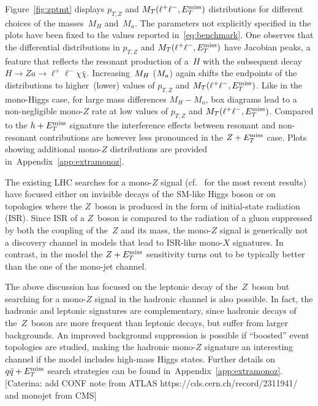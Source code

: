 Figure~\ref{fig:zptmt} displays  $p_{T,Z}$ and $M_T(\ell^+ \ell^-, E_T^\mathrm{miss})$ distributions for different choices of the masses~$M_H$ and~$M_a$. The parameters not explicitly specified in the plots have been fixed to the values reported in~\eqref{eq:benchmark}. One observes that the differential distributions in $p_{T,Z}$ and $M_T(\ell^+ \ell^-, E_T^\mathrm{miss})$ have Jacobian peaks, a feature that  reflects the resonant production of a~$H$ with the subsequent decay $H \to Z a \to \ell^+ \ell^- \chi \bar \chi$.  Increasing~$M_{H}$ ($M_{a}$) again shifts the endpoints of the distributions to higher~(lower) values of $p_{T,Z}$ and $M_T(\ell^+ \ell^-, E_T^\mathrm{miss})$. Like in the mono-Higgs case, for large mass differences $M_H - M_a$, box diagrams lead to a non-negligible mono-$Z$ rate at low values of $p_{T,Z}$ and $M_T(\ell^+ \ell^-, E_T^\mathrm{miss})$. Compared to the $h + E_T^\mathrm{miss}$ signature the interference effects between resonant and non-resonant contributions  are however  less pronounced  in  the $Z + E_T^\mathrm{miss}$  case. Plots showing additional  mono-$Z$ distributions are provided in~Appendix~\ref{app:extramonoz}. 

The existing LHC searches for a mono-$Z$ signal (cf.~\cite{Aaboud:2017bja,Sirunyan:2017qfc} for the most recent results) have  focused either on invisible decays of the SM-like Higgs boson or on topologies where the $Z$~boson is produced in the form of initial-state radiation (ISR). Since ISR of a $Z$~boson is compared to the radiation of a gluon suppressed by both the coupling of the~$Z$ and its mass, the mono-$Z$ signal is generically not a discovery channel in models that lead to ISR-like mono-$X$ signatures. In contrast, in the \hdma model the $Z+E_T^\mathrm{miss}$ sensitivity  turns out to be typically better than the one of the mono-jet channel. 

The above discussion has focused on the leptonic decay of the~$Z$~boson but searching for a mono-$Z$ signal in the hadronic channel is also possible. In fact, the hadronic and leptonic signatures  are complementary, since hadronic decays of the~$Z$~boson are more frequent than leptonic decays, but suffer from larger backgrounds. An improved background suppression is possible if ``boosted'' event topologies are studied, making the hadronic mono-$Z$ signature an interesting channel if the \hdma model includes high-mass Higgs states. Further details on $q \bar q + E_T^\mathrm{miss}$ search strategies can be found in~Appendix~\ref{app:extramonoz}. \color{red}[Caterina: add CONF note from ATLAS https://cds.cern.ch/record/2311941/ and monojet from CMS]\color{black}

